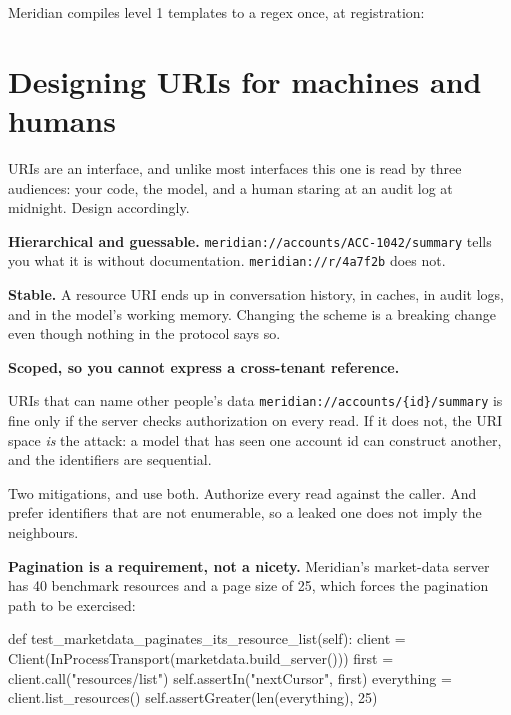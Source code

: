 Meridian compiles level 1 templates to a regex once, at registration:


\section{Designing URIs for machines and humans}

URIs are an interface, and unlike most interfaces this one is read by three
audiences: your code, the model, and a human staring at an audit log at
midnight. Design accordingly.

\textbf{Hierarchical and guessable.}
\texttt{meridian://accounts/ACC-1042/summary} tells you what it is without
documentation. \texttt{meridian://r/4a7f2b} does not.

\textbf{Stable.} A resource URI ends up in conversation history, in caches, in
audit logs, and in the model's working memory. Changing the scheme is a breaking
change even though nothing in the protocol says so.

\textbf{Scoped, so you cannot express a cross-tenant reference.}

\begin{dangerbox}{URIs that can name other people's data}
\texttt{meridian://accounts/\{id\}/summary} is fine only if the server checks
authorization on every read. If it does not, the URI space \emph{is} the attack:
a model that has seen one account id can construct another, and the identifiers
are sequential.

Two mitigations, and use both. Authorize every read against the caller. And
prefer identifiers that are not enumerable, so a leaked one does not imply the
neighbours.
\end{dangerbox}

\textbf{Pagination is a requirement, not a nicety.} Meridian's market-data
server has 40 benchmark resources and a page size of 25, which forces the pagination path to be exercised:

\begin{py}
def test_marketdata_paginates_its_resource_list(self):
    client = Client(InProcessTransport(marketdata.build_server()))
    first = client.call("resources/list")
    self.assertIn("nextCursor", first)
    everything = client.list_resources()
    self.assertGreater(len(everything), 25)
\end{py}

